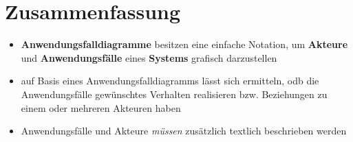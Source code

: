 \section{Zusammenfassung}



\begin{itemize}
    \item \textbf{Anwendungsfalldiagramme} besitzen eine einfache Notation, um \textbf{Akteure} und \textbf{Anwendungsfälle} eines \textbf{Systems} grafisch darzustellen
    \item auf Basis eines Anwendungsfalldiagramms lässt sich ermitteln, odb die Anwendungsfälle gewünschtes Verhalten realisieren bzw. Beziehungen zu einem oder mehreren Akteuren haben
    \item Anwendungsfälle und Akteure \textit{müssen} zusätzlich textlich beschrieben werden
\end{itemize}
